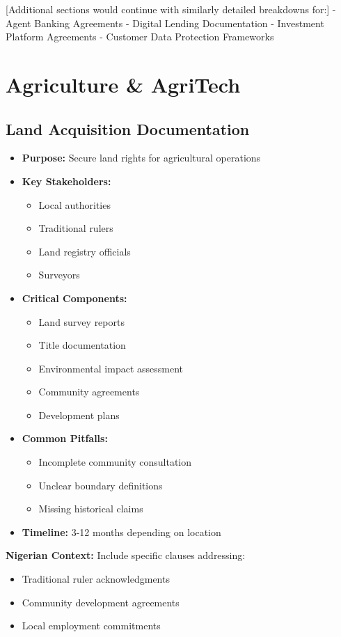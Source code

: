 [Additional sections would continue with similarly detailed breakdowns for:]
- Agent Banking Agreements
- Digital Lending Documentation
- Investment Platform Agreements
- Customer Data Protection Frameworks

\section{Agriculture \& AgriTech}

\subsection{Land Acquisition Documentation}
\begin{tcolorbox}[colback=white,colframe=primarydark,title=\textbf{Agricultural Land Documentation}]
\begin{itemize}
    \item \textbf{Purpose:} Secure land rights for agricultural operations
    \item \textbf{Key Stakeholders:}
    \begin{itemize}
        \item Local authorities
        \item Traditional rulers
        \item Land registry officials
        \item Surveyors
    \end{itemize}
    \item \textbf{Critical Components:}
    \begin{itemize}
        \item Land survey reports
        \item Title documentation
        \item Environmental impact assessment
        \item Community agreements
        \item Development plans
    \end{itemize}
    \item \textbf{Common Pitfalls:}
    \begin{itemize}
        \item Incomplete community consultation
        \item Unclear boundary definitions
        \item Missing historical claims
    \end{itemize}
    \item \textbf{Timeline:} 3-12 months depending on location
\end{itemize}

\textbf{Nigerian Context:}
Include specific clauses addressing:
\begin{itemize}
    \item Traditional ruler acknowledgments
    \item Community development agreements
    \item Local employment commitments
\end{itemize}
\end{tcolorbox}

